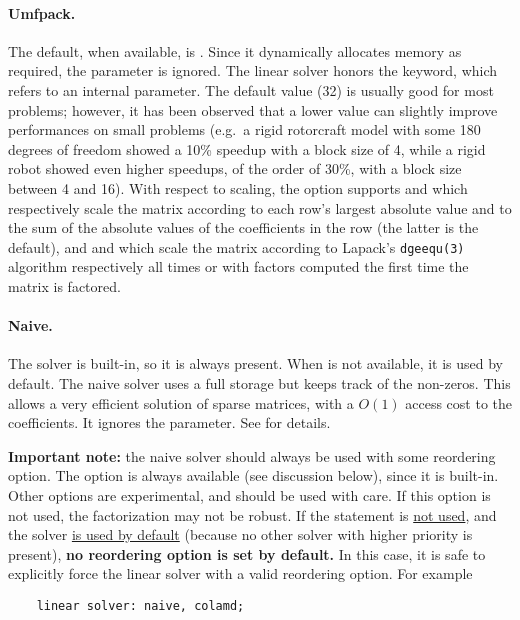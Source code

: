 \paragraph{Umfpack.}
The default, when available, is .
Since it dynamically allocates memory as required, the  
parameter is ignored.
The  linear solver honors the  keyword,
which refers to an internal parameter.
The default value (32) is usually good for most problems; however,
it has been observed that a lower value can slightly improve
performances on small problems (e.g.\ a rigid rotorcraft model
with some 180 degrees of freedom showed a 10\% speedup with 
a block size of 4, while a rigid robot showed even higher speedups,
of the order of 30\%, with a block size between 4 and 16).
With respect to scaling, the  option supports  and 
which respectively scale the matrix according to each row's
largest absolute value and to the sum of the absolute values
of the coefficients in the row (the latter is the default),
and  and  which scale the matrix
according to Lapack's \texttt{dgeequ(3)} algorithm
respectively all times or with factors computed the first time
the matrix is factored.

\paragraph{Naive.}
The  solver is built-in, so it is always present.
When  is not available, it is used by default.
The naive solver uses a full storage but keeps track of the non-zeros.
This allows a very efficient solution of sparse matrices, with
a $O(1)$ access cost to the coefficients.
It ignores the  parameter.
See \cite{NAIVE-2007} for details.

\bigskip
\begin{minipage}{.9\textwidth}
\textbf{Important note:} the naive solver should always be used
with some reordering option.
The  option is always available (see discussion below),
since it is built-in.
Other options are experimental, and should be used with care.
If this option is not used, the factorization may not be robust.
If the  statement is \underline{not used},
and the  solver \underline{is used by default}
(because no other solver with higher priority is present),
\textbf{no reordering option is set by default.}
In this case, it is safe to explicitly force the linear solver
with a valid reordering option.  For example
\begin{verbatim}
    linear solver: naive, colamd;
\end{verbatim}
\end{minipage}

